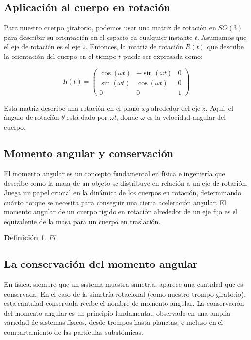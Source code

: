 \documentclass{article}
\newtheorem{definition}[theorem]{Definición}
\begin{document}
\subsection{Aplicación al cuerpo en rotación}

Para nuestro cuerpo giratorio, podemos usar una matriz de rotación en $SO(3)$ para describir su orientación en el espacio en cualquier instante $t$. Asumamos que el eje de rotación es el eje $z$. Entonces, la matriz de rotación $R(t)$ que describe la orientación del cuerpo en el tiempo $t$ puede ser expresada como:

\[
  R(t) = 
  \begin{pmatrix}
    \cos(\omega t) & -\sin(\omega t) & 0 \\
    \sin(\omega t) & \cos(\omega t) & 0 \\
    0 & 0 & 1
  \end{pmatrix}
\]

Esta matriz describe una rotación en el plano $xy$ alrededor del eje $z$. Aquí, el ángulo de rotación $\theta$ está dado por $\omega t$, donde $\omega$ es la velocidad angular del cuerpo.

\subsection{Momento angular y conservación}

El momento angular es un concepto fundamental en física e ingeniería que describe como la masa de un objeto se distribuye en relación a un eje de rotación. Juega un papel crucial en la dinámica de los cuerpos en rotación, determinando cuánto torque se necesita para conseguir una cierta aceleración angular. El momento angular de un cuerpo rígido en rotación alrededor de un eje fijo es el equivalente de la masa para un cuerpo en traslación.

\begin{definition}
  El 
\end{definition}

\subsection{La conservación del momento angular}

En física, siempre que un sistema muestra simetría, aparece una cantidad que es conservada. En el caso de la simetría rotacional (como nuestro trompo giratorio), esta cantidad conservada recibe el nombre de momento angular. La conservación del momento angular es un principio fundamental, observado en una amplia variedad de sistemas físicos, desde trompos hasta planetas, e incluso en el compartamiento de las partículas subatómicas.

\begin{thebibliography}{9}
\end{thebibliography}
\end{document}
